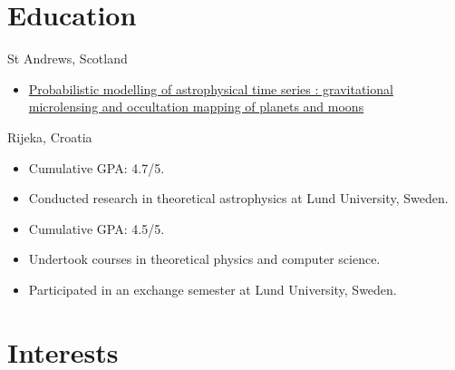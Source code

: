 \documentclass[11pt,a4paper,roman, colorlinks]{moderncv}
\begin{document}
\section{Education}
{St Andrews, Scotland}{}{\begin{itemize}
    \item \href{https://research-repository.st-andrews.ac.uk/handle/10023/27130}{Probabilistic modelling of astrophysical time series : gravitational microlensing and occultation mapping of planets and moons}
\end{itemize}
}
{Rijeka, Croatia}{}{\begin{itemize}\item Cumulative GPA: 4.7/5.
    \item Conducted research in theoretical astrophysics at Lund University, Sweden.
\end{itemize}}
{\begin{itemize}\item Cumulative GPA: 4.5/5.
        \item Undertook courses in theoretical physics and computer science.
        \item Participated in an exchange semester at Lund University, Sweden.
    \end{itemize}}

\section{Interests}
\end{document}
